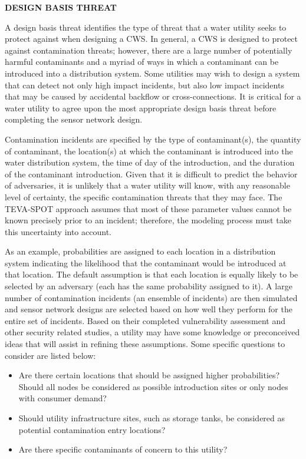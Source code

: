 {\bf DESIGN BASIS THREAT}

A design basis threat identifies the type of threat that a water utility seeks to protect against when designing a CWS. In general, a CWS is designed to protect against contamination threats; however, there are a large number of potentially harmful contaminants and a myriad of ways in which a contaminant can be introduced into a distribution system. Some utilities may wish to design a system that can detect not only high impact incidents, but also low impact incidents that may be caused by accidental backflow or cross-connections. It is critical for a water utility to agree upon the most appropriate design basis threat before completing the sensor network design. 

Contamination incidents are specified by the type of contaminant(s), the quantity of contaminant, the location(s) at which the contaminant is introduced into the water distribution system, the time of day of the introduction, and the duration of the contaminant introduction. Given that it is difficult to predict the behavior of adversaries, it is unlikely that a water utility will know, with any reasonable level of certainty, the specific contamination threats that they may face.  The TEVA-SPOT approach assumes that most of these parameter values cannot be known precisely prior to an incident; therefore, the modeling process must take this uncertainty into account.  

As an example, probabilities are assigned to each location in a distribution system indicating the likelihood that the contaminant would be introduced at that location.  The default assumption is that each location is equally likely to be selected by an adversary (each has the same probability assigned to it). A large number of contamination incidents (an ensemble of incidents) are then simulated and sensor network designs are selected based on how well they perform for the entire set of incidents.  Based on their completed vulnerability assessment and other security related studies, a utility may have some knowledge or preconceived ideas that will assist in refining these assumptions.  Some specific questions to consider are listed below:
\begin{itemize} 
\item Are there certain locations that should be assigned higher probabilities? Should all nodes be considered as possible introduction sites or only nodes with consumer demand?  
\item Should utility infrastructure sites, such as storage tanks, be considered as potential contamination entry locations?
\item Are there specific contaminants of concern to this utility? 
\end{itemize}

